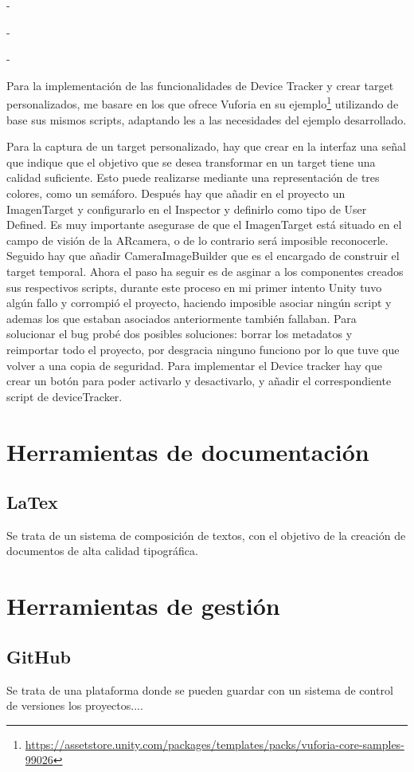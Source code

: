 -

-

-

Para la implementación de las funcionalidades de Device Tracker y crear target personalizados, me basare en los que ofrece Vuforia en su ejemplo\footnote{\url{https://assetstore.unity.com/packages/templates/packs/vuforia-core-samples-99026}} utilizando de base sus mismos scripts, adaptando les a las necesidades del ejemplo desarrollado.

Para la captura de un target personalizado, hay que crear en la interfaz una señal que indique que el objetivo que se desea transformar en un target tiene una calidad suficiente. Esto puede realizarse mediante una representación de tres colores, como un semáforo. Después hay que añadir en el proyecto un ImagenTarget y configurarlo en el Inspector y definirlo como tipo de User Defined. Es muy importante asegurase de que el ImagenTarget está situado en el campo de visión de la ARcamera, o de lo contrario será imposible reconocerle. Seguido hay que añadir CameraImageBuilder que es el encargado de construir el target temporal. Ahora el paso ha seguir es de asginar a los componentes creados sus respectivos scripts, durante este proceso en mi primer intento Unity tuvo algún fallo y corrompió el proyecto, haciendo imposible asociar ningún script y ademas los que estaban asociados anteriormente también fallaban. Para solucionar el bug probé dos posibles soluciones: borrar los metadatos y reimportar todo el proyecto, por desgracia ninguno funciono por lo que tuve que volver a una copia de seguridad.
Para implementar el Device tracker hay que crear un botón para poder activarlo y desactivarlo, y añadir el correspondiente script de deviceTracker.




\section{Herramientas de documentación}
\subsection{LaTex}
Se trata de un sistema de composición de textos, con el objetivo de la creación de documentos de alta calidad tipográfica.
\section{Herramientas de gestión}
\subsection{GitHub}
Se trata de una plataforma donde se pueden guardar con un sistema de control de versiones los proyectos....

